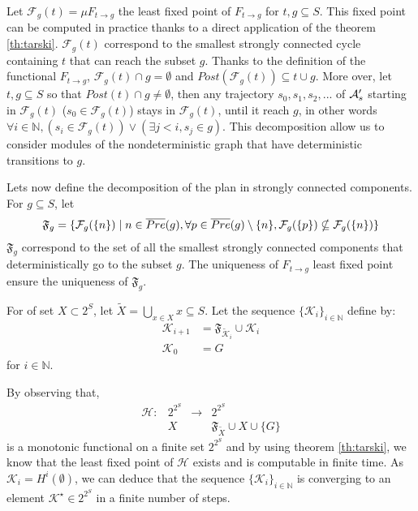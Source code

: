 Let $\mathcal{F}_g(t) = \mu F_{t \rightarrow g}$ the least fixed point of $F_{t \rightarrow g}$ for $t,g \subseteq S$.
This fixed point can be computed in practice thanks to a direct application of the theorem \ref{th:tarski}.
$\mathcal{F}_g(t)$ correspond to the smallest strongly connected cycle containing $t$ that can reach the subset $g$.
Thanks to the definition of the functional $F_{t \rightarrow g}$, $\mathcal{F}_g(t) \cap g = \emptyset$ and $Post(\mathcal{F}_g(t)) \subseteq t \cup g$.
More over, let $t,g \subseteq S$ so that $Post(t) \cap g \neq \emptyset$, then any trajectory $s_0,s_1,s_2,...$ of $\mathcal{A}_s'$ starting in $\mathcal{F}_g(t)$ ($s_0 \in \mathcal{F}_g(t)$) stays in $\mathcal{F}_g(t)$, until it reach $g$, in other words $\forall i\in \mathbb{N}, (s_i \in \mathcal{F}_g(t)) \lor (\exists j<i, s_j \in g)$.
This decomposition allow us to consider modules of the nondeterministic graph that have deterministic transitions to $g$.

Lets now define the decomposition of the plan in strongly connected components.
For $g \subseteq S$, let 
\begin{equation}
\mathfrak{F}_g = \{ \mathcal{F}_g(\{n\}) \mid n \in \overline{Pre} (g), \forall p \in \overline{Pre} (g) \setminus \{n\}, \mathcal{F}_g(\{p\}) \nsubseteq \mathcal{F}_g(\{n\}) \}
\end{equation}
$\mathfrak{F}_g$ correspond to the set of all the smallest strongly connected components that deterministically go to the subset $g$.
The uniqueness of  $F_{t \rightarrow g}$ least fixed point ensure the uniqueness of $\mathfrak{F}_g$.

For  of set $X \subset 2^S$, let $\tilde{X} = \bigcup_{x \in X} x \subseteq S$.
Let the sequence $\{\mathcal{K}_i\}_{i \in \mathbb{N}}$ define by:
\begin{equation*}
\begin{split}
\mathcal{K}_{i+1} &= \mathfrak{F}_{\tilde{\mathcal{K}}_i} \cup \mathcal{K}_i\\
\mathcal{K}_0 &= G
\end{split}
\end{equation*}
for $i \in \mathbb{N}$. 

By observing that,
\begin{equation}
\begin{array}{llll}
\mathcal{H} : &2^{2^S} &\rightarrow &2^{2^S}\\
&X & & \mathfrak{F}_{\tilde{X}} \cup X \cup \{ G \}
\end{array}
\end{equation}
is a monotonic functional on a finite set $2^{2^S}$ and by using theorem \ref{th:tarski}, we know that the least fixed point of $\mathcal{H}$ exists and is computable in finite time.
As $\mathcal{K}_i = H^i(\emptyset)$, we can deduce that the sequence $\{\mathcal{K}_i\}_{i \in \mathbb{N}}$ is converging to an element $\mathcal{K}^\star \in 2^{2^S}$ in a finite number of steps.

